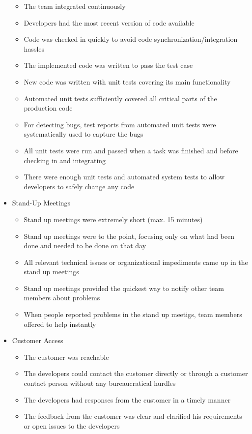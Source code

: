 \begin{appendices}
\begin{itemize}
		\begin{itemize}
			\item The team integrated continuously
			\item Developers had the most recent version of code available
			\item Code was checked in quickly to avoid code synchronization/integration hassles
			\item The implemented code was written to pass the test case
			\item New code was written with unit tests covering its main functionality
			\item Automated unit tests sufficiently covered all critical parts of the production code
			\item For detecting bugs, test reports from automated unit tests were systematically used to capture the bugs
			\item All unit tests were run and passed when a task was finished and before checking in and integrating
			\item There were enough unit tests and automated system tests to allow developers to safely change any code
		\end{itemize}
	\item Stand-Up Meetings
		\begin{itemize}
			\item Stand up meetings were extremely short (max. 15 minutes)
			\item Stand up meetings were to the point, focusing only on what had been done and needed to be done on that day
			\item All relevant technical issues or organizational impediments came up in the stand up meetings
			\item Stand up meetings provided the quickest way to notify other team members about problems
			\item When people reported problems in the stand up meetigs, team members offered to help instantly
		\end{itemize}
	\item Customer Access
		\begin{itemize}
			\item The customer was reachable
			\item The developers could contact the customer directly or through a customer contact person without any bureaucratical hurdles
			\item The developers had responses from the customer in a timely manner
			\item The feedback from the customer was clear and clarified his requirements or open issues to the developers

\end{itemize}
\end{itemize}
\end{appendices}
